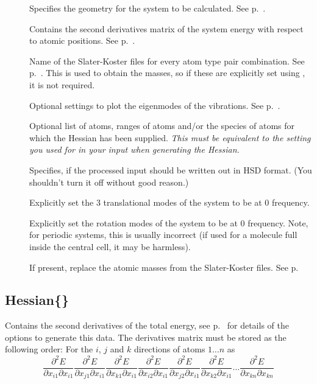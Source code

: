 \begin{description}
\item[] Specifies the geometry for the system to be
  calculated.  See p.~.
\item[] Contains the second derivatives matrix of the
  system energy with respect to atomic positions. See
  p.~.
\item[] Name of the Slater-Koster files for
  every atom type pair combination. See
  p.~. This is used to obtain the
  masses, so if these are explicitly set using , it is
  not required.
\item[] Optional settings to plot the eigenmodes of the
  vibrations. See p.~.
\item[] Optional list of atoms, ranges of atoms and/or the species of
  atoms for which the Hessian has been supplied. \emph{This must be equivalent
    to the setting you used for  in your \dftbp{} input when
    generating the Hessian.}
\item[] Specifies, if the processed input should be written
  out in HSD format. (You shouldn't turn it off without good reason.)
\item[] Explicitly set the 3 translational modes of the
  system to be at 0 frequency.
\item[] Explicitly set the rotation modes of the system to be
  at 0 frequency. Note, for periodic systems, this is usually incorrect (if used
  for a molecule full inside the central cell, it may be harmless).
\item[] If present, replace the atomic masses from the Slater-Koster files. See
  p.~
\end{description}


\subsection{Hessian\{\}}
\label{sec:modes.Hessian}

Contains the second derivatives of the total energy,
see p.~ for details of the \dftbp{}
options to generate this data. The derivatives matrix must be stored
as the following order: For the $i$, $j$ and $k$ directions of atoms
$1 \ldots n$ as
\begin{equation*}
  \frac{\partial^2 E}{\partial x_{i1} \partial x_{i1}} \frac{\partial^2
    E}{\partial x_{j1} \partial x_{i1}} \frac{\partial^2 E}{\partial x_{k1}
    \partial x_{i1}} \frac{\partial^2 E}{\partial x_{i2} \partial x_{i1}}
  \frac{\partial^2 E}{\partial x_{j2} \partial x_{i1}} \frac{\partial^2
    E}{\partial x_{k2} \partial x_{i1}} \ldots \frac{\partial^2 E}{\partial
    x_{kn} \partial x_{kn}}
\end{equation*}

